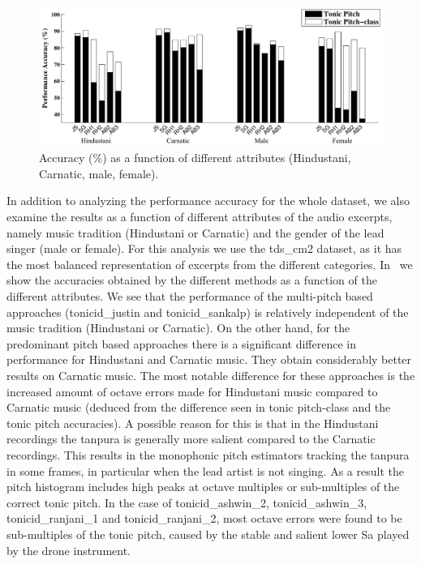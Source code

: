 {\begin{figure}
	\begin{center}
		\includegraphics[width=\figSizeHundred]{ch05_preprocessing/figures/Category_Performance.pdf}
	\end{center}
	\caption{Accuracy (\%) as a function of different attributes
		(Hindustani, Carnatic, male, female).}
	\label{fig:tonic_id_categorywise_performance}
\end{figure}

In addition to analyzing the performance accuracy for the whole dataset, we also examine the results as a function of different attributes of
the audio excerpts, namely music tradition (Hindustani or Carnatic) and the gender of the lead singer (male or female). For this analysis we use the \acrshort{tds_cm2} dataset, as it has the most balanced representation of excerpts from the different categories. In~ we show the accuracies obtained by the different methods as a function of the different attributes. We see that the performance of the multi-pitch based approaches (\acrshort{tonicid_justin} and \acrshort{tonicid_sankalp}) is relatively independent of the music tradition (Hindustani or Carnatic). On the other hand, for the predominant pitch based approaches there is a significant difference in performance for Hindustani and Carnatic music. They obtain considerably better results on Carnatic music. The most notable difference for these approaches is the increased amount of octave errors made for Hindustani music compared to Carnatic music (deduced from the difference seen in tonic pitch-class and the tonic pitch accuracies). A possible reason for this is that in the Hindustani recordings the \gls{tanpura} is generally more salient compared to the Carnatic recordings. This results in the monophonic pitch estimators tracking the \gls{tanpura} in some frames, in particular when the lead artist is not singing. As a result the pitch histogram includes high peaks at octave multiples or sub-multiples of the correct tonic pitch. In the case of \acrshort{tonicid_ashwin_2}, \acrshort{tonicid_ashwin_3}, \acrshort{tonicid_ranjani_1} and \acrshort{tonicid_ranjani_2}, most octave errors were found to be sub-multiples of the tonic pitch, caused by the stable and salient lower Sa played by the drone instrument.

}
